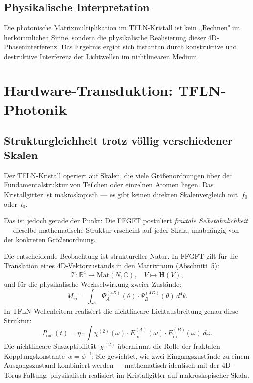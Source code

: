 \subsection{Physikalische Interpretation}

Die photonische Matrixmultiplikation im TFLN-Kristall ist kein „Rechnen"
im herkömmlichen Sinne, sondern die physikalische Realisierung dieser
4D-Phaseninterferenz. Das Ergebnis ergibt sich instantan durch konstruktive
und destruktive Interferenz der Lichtwellen im nichtlinearen Medium.

\section{Hardware-Transduktion: TFLN-Photonik}

\subsection{Strukturgleichheit trotz völlig verschiedener Skalen}

\begin{warnbox}
Der TFLN-Kristall operiert auf Skalen, die viele Größenordnungen über der
Fundamentalstruktur von Teilchen oder einzelnen Atomen liegen. Das Kristallgitter
ist makroskopisch — es gibt keinen direkten Skalenvergleich mit~$f_0$ oder~$t_0$.

Das ist jedoch gerade der Punkt: Die FFGFT postuliert \emph{fraktale
Selbstähnlichkeit} — dieselbe mathematische Struktur erscheint auf jeder Skala,
unabhängig von der konkreten Größenordnung.
\end{warnbox}

Die entscheidende Beobachtung ist struktureller Natur. In FFGFT gilt für
die Translation eines 4D-Vektorzustands in den Matrixraum (Abschnitt~5):
\begin{equation}
  \mathcal{T}: \mathbb{R}^4 \to \mathrm{Mat}(N,\mathbb{C}),\quad
  V \mapsto \mathbf{H}(V),
\end{equation}
und für die physikalische Wechselwirkung zweier Zustände:
\begin{equation}
  M_{ij} = \int_{\mathcal{T}^4}
    \Psi_A^{(4D)}(\theta)\cdot\Psi_B^{(4D)}(\theta)\,d^4\theta.
\end{equation}
In TFLN-Wellenleitern realisiert die nichtlineare Lichtausbreitung
genau diese Struktur:
\begin{equation}
  P_{\text{out}}(t)
  = \eta \cdot \int \chi^{(2)}(\omega)
    \cdot E_{\text{in}}^{(A)}(\omega)
    \cdot E_{\text{in}}^{(B)}(\omega)\,d\omega.
\end{equation}
Die nichtlineare Suszeptibilität~$\chi^{(2)}$ übernimmt die Rolle der
fraktalen Kopplungskonstante~$\alpha = \phi^{-1}$: Sie gewichtet, wie
zwei Eingangszustände zu einem Ausgangszustand kombiniert werden —
mathematisch identisch mit der 4D-Torus-Faltung, physikalisch realisiert
im Kristallgitter auf makroskopischer Skala.

